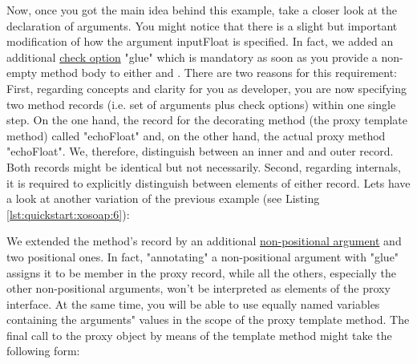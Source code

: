 Now, once you got the main idea behind this example, take a closer
look at the declaration of arguments. You might notice that
there is a slight but important modification of how the argument
inputFloat is specified. In fact, we added an additional
\href{http://media.wu-wien.ac.at/doc/tutorial.html#non-pos-args}{check
option} "glue" which is mandatory as soon as you provide a non-empty
method body to either
 and
. There are
two reasons for this requirement: First, regarding concepts and
clarity for you as developer, you are now specifying two method
records (i.e. set of arguments plus check options) within one single
step. On the one hand, the record for the decorating method (the proxy
template method) called "echoFloat" and, on the other hand, the actual
proxy method "echoFloat". We, therefore, distinguish between an inner
and and outer record. Both records might be identical but not
necessarily. Second, regarding internals, it is required to explicitly
distinguish between elements of either record. Lets have a look at
another variation of the previous example (see Listing \ref{lst:quickstart:xosoap:6}):
%
%

%
We extended the method's record by an additional
\href{http://media.wu-wien.ac.at/doc/tutorial.html#non-pos-args}{non-positional
argument} and two positional ones. In fact, "annotating" a
non-positional argument with "glue" assigns it to be member in the
proxy record, while all the others, especially the other
non-positional arguments, won't be interpreted as elements of the
proxy interface. At the same time, you will be able to use equally
named variables containing the arguments" values in the scope of the
proxy template method. The final call to the proxy object by means of
the template method might take the following form:
%
%

